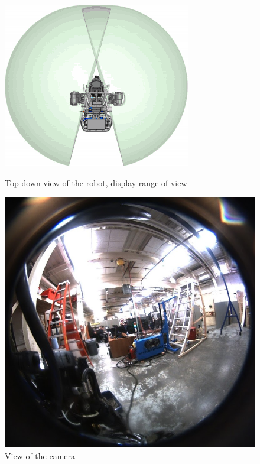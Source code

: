 \documentclass[12pt]{report}
\begin{document}
\begin{figure}[ht]
\begin{center}
\begin{minipage}[b]{0.4\linewidth}
\centering
\includegraphics[width=\textwidth]{images/sitcamFOV.png}
\caption{Top-down view of the robot, display range of view}
\label{fig:figure1}
\end{minipage}
\hspace{0.5cm}
\begin{minipage}[b]{0.4\linewidth}
\centering
\includegraphics[width=\textwidth]{images/fisheye.jpg}
\caption{View of the camera}
\label{fig:figure2}
\end{minipage}
\end{center}
\end{figure}
\end{document}
